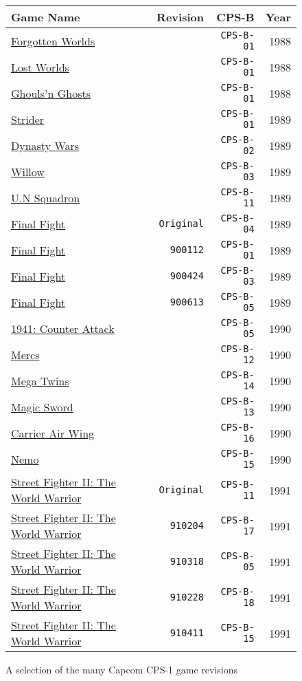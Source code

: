 \begin{figure}[H]
{ \setlength{\tabcolsep}{3.0pt}
\begin{tabularx}{\textwidth}{Xrrr} 
  \textbf{Game Name} & \textbf{Revision} & \textbf{ CPS-B }  & \textbf{ Year } \\               
  \toprule    
\href{}{Forgotten Worlds} & & \texttt{CPS-B-01} & 1988 \\ 
\href{}{Lost Worlds} & & \texttt{CPS-B-01} & 1988 \\ 
\href{}{Ghouls'n Ghosts} & & \texttt{CPS-B-01} & 1988 \\ 
  \toprule    
\href{}{Strider} & & \texttt{CPS-B-01} & 1989 \\ 
\href{}{Dynasty Wars} & & \texttt{CPS-B-02} & 1989 \\ 
\href{}{Willow} & & \texttt{CPS-B-03} & 1989 \\ 
\href{}{U.N Squadron} & & \texttt{CPS-B-11}   & 1989 \\ 

\href{}{Final Fight } & \texttt{Original} & \texttt{CPS-B-04} & 1989 \\ %
\href{}{Final Fight } & \texttt{900112}& \texttt{CPS-B-01} & 1989 \\ %
\href{}{Final Fight } & \texttt{900424}& \texttt{CPS-B-03} & 1989 \\ %
\href{}{Final Fight } & \texttt{900613}& \texttt{CPS-B-05} & 1989 \\ %

  \toprule    
\href{}{1941: Counter Attack} & & \texttt{CPS-B-05} &  1990 \\ 
\href{}{Mercs} & &  \texttt{CPS-B-12} & 1990 \\ 
\href{}{Mega Twins} & & \texttt{CPS-B-14} & 1990 \\ 
\href{}{Magic Sword} & & \texttt{CPS-B-13} & 1990 \\ 
\href{}{Carrier Air Wing} & & \texttt{CPS-B-16}  & 1990 \\ 
\href{}{Nemo} & & \texttt{CPS-B-15} &  1990 \\ 
  \toprule    
\href{}{Street Fighter II: The World Warrior }&  \texttt{Original}& \texttt{CPS-B-11} & 1991 \\  %
\href{}{Street Fighter II: The World Warrior } & \texttt{910204}& \texttt{CPS-B-17} & 1991 \\  %
\href{}{Street Fighter II: The World Warrior } & \texttt{910318}& \texttt{CPS-B-05} & 1991 \\  %
\href{}{Street Fighter II: The World Warrior } & \texttt{910228}& \texttt{CPS-B-18} & 1991 \\  %
\href{}{Street Fighter II: The World Warrior } & \texttt{910411}& \texttt{CPS-B-15} & 1991 \\  %
\toprule    
\end{tabularx}%
}\caption*{A selection of the many Capcom CPS-1 game revisions}
\end{figure}

